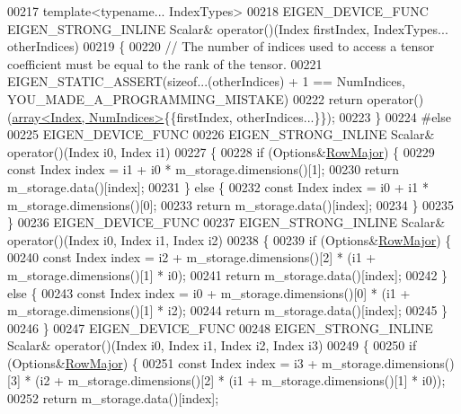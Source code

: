 \begin{DoxyCode}
00217     \textcolor{keyword}{template}<\textcolor{keyword}{typename}... IndexTypes>
00218     EIGEN\_DEVICE\_FUNC EIGEN\_STRONG\_INLINE Scalar& operator()(Index firstIndex, IndexTypes... otherIndices)
00219     \{
00220       \textcolor{comment}{// The number of indices used to access a tensor coefficient must be equal to the rank of the tensor.}
00221       EIGEN\_STATIC\_ASSERT(\textcolor{keyword}{sizeof}...(otherIndices) + 1 == NumIndices, YOU\_MADE\_A\_PROGRAMMING\_MISTAKE)
00222       \textcolor{keywordflow}{return} operator()(\hyperlink{class_eigen_1_1array}{array<Index, NumIndices>}\{\{firstIndex, otherIndices...\}\});
00223     \}
00224 \textcolor{preprocessor}{#else}
00225     EIGEN\_DEVICE\_FUNC
00226     EIGEN\_STRONG\_INLINE Scalar& operator()(Index i0, Index i1)
00227     \{
00228        \textcolor{keywordflow}{if} (Options&\hyperlink{group__enums_ggaacded1a18ae58b0f554751f6cdf9eb13acfcde9cd8677c5f7caf6bd603666aae3}{RowMajor}) \{
00229          \textcolor{keyword}{const} Index index = i1 + i0 * m\_storage.dimensions()[1];
00230         \textcolor{keywordflow}{return} m\_storage.data()[index];
00231       \} \textcolor{keywordflow}{else} \{
00232         \textcolor{keyword}{const} Index index = i0 + i1 * m\_storage.dimensions()[0];
00233         \textcolor{keywordflow}{return} m\_storage.data()[index];
00234       \}
00235     \}
00236     EIGEN\_DEVICE\_FUNC
00237     EIGEN\_STRONG\_INLINE Scalar& operator()(Index i0, Index i1, Index i2)
00238     \{
00239        \textcolor{keywordflow}{if} (Options&\hyperlink{group__enums_ggaacded1a18ae58b0f554751f6cdf9eb13acfcde9cd8677c5f7caf6bd603666aae3}{RowMajor}) \{
00240          \textcolor{keyword}{const} Index index = i2 + m\_storage.dimensions()[2] * (i1 + m\_storage.dimensions()[1] * i0);
00241         \textcolor{keywordflow}{return} m\_storage.data()[index];
00242       \} \textcolor{keywordflow}{else} \{
00243          \textcolor{keyword}{const} Index index = i0 + m\_storage.dimensions()[0] * (i1 + m\_storage.dimensions()[1] * i2);
00244         \textcolor{keywordflow}{return} m\_storage.data()[index];
00245       \}
00246     \}
00247     EIGEN\_DEVICE\_FUNC
00248     EIGEN\_STRONG\_INLINE Scalar& operator()(Index i0, Index i1, Index i2, Index i3)
00249     \{
00250       \textcolor{keywordflow}{if} (Options&\hyperlink{group__enums_ggaacded1a18ae58b0f554751f6cdf9eb13acfcde9cd8677c5f7caf6bd603666aae3}{RowMajor}) \{
00251         \textcolor{keyword}{const} Index index = i3 + m\_storage.dimensions()[3] * (i2 + m\_storage.dimensions()[2] * (i1 + 
      m\_storage.dimensions()[1] * i0));
00252         \textcolor{keywordflow}{return} m\_storage.data()[index];

\end{DoxyCode}
